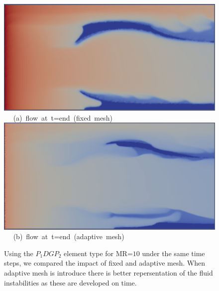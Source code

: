 \begin{landscape}
\begin{figure}[ht] 
\vbox{
\hbox{\hspace{3.5cm}
\includegraphics[width=.8\textwidth]{./Pics1/mr10_5regions_fixed/5regions_fixed_2000.pdf} 
}
\vspace{0.0cm}
\hbox{\hspace{6.5cm} (a) flow at t=end (fixed mesh)   
}
\vspace{0.25cm}
\hbox{\hspace{3.5cm}
\includegraphics[width=.8\textwidth]{./Pics1/mr10_5regions_adapt/5regions_adapt_3000.pdf}
}
\vspace{0.0cm}
\hbox{\hspace{6.5cm} (b) flow at t=end (adaptive mesh)     
}
}     
\caption{Using the $P_{1}DGP_{2}$ element type for MR=$10$ under the same time steps, we compared the impact of fixed and adaptive mesh. When adaptive mesh is introduce there is better repersentation of the fluid instabilities as these are developed on time.}
\label{fig:2testcase_d}
\end{figure}
\end{landscape}
\clearpage

